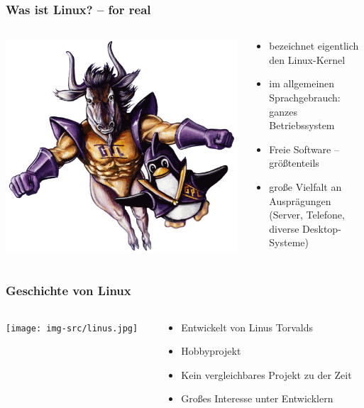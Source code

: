\documentclass[t]{beamer}
\begin{document}
\begin{frame}
  \frametitle{Was ist Linux? – for real}
  \begin{columns}
    \begin{column}[T]{0.45\textwidth}
      \includegraphics[width=\textwidth]{img-src/linux-gnu.png}
    \end{column}
    \begin{column}{0.45\textwidth}
      \begin{itemize}
      \item bezeichnet eigentlich den Linux-Kernel
      \item im allgemeinen Sprachgebrauch: ganzes Betriebssystem
      \item Freie Software – größtenteils
      \item große Vielfalt an Ausprägungen (Server, Telefone, diverse
        Desktop-Systeme)
      \end{itemize}
    \end{column}
  \end{columns}
\end{frame}

\begin{frame}
  \frametitle{Geschichte von Linux}
  \begin{columns}
    \begin{column}[T]{0.4\textwidth}
      \texttt{[image: img-src/linus.jpg]}
    \end{column}
    \begin{column}{0.5\textwidth}
      \begin{itemize}
      \item Entwickelt von Linus Torvalds
      \item Hobbyprojekt
      \item Kein vergleichbares Projekt zu der Zeit
      \item Großes Interesse unter Entwicklern
      \end{itemize}
    \end{column}
  \end{columns}
\end{frame}
\end{document}
